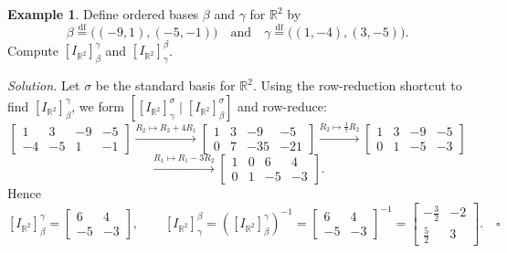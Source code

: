 \documentclass[11pt, a4paper, notitlepage]{report}
\theoremstyle{definition}
\newtheorem{example}[theorem]{Example}
\theoremstyle{remark}
\begin{document}
\begin{example}
\label{ex:change-coord-R2}
Define ordered bases $\beta$ and $\gamma$ for $\mathbb{R}^2$ by
\[
  \beta \stackrel{\mathrm{df}}{=} \bigl((-9,1),(-5,-1)\bigr)
  \quad\text{and}\quad
  \gamma \stackrel{\mathrm{df}}{=} \bigl((1,-4),(3,-5)\bigr).
\]
Compute $[I_{\mathbb{R}^2}]_\beta^\gamma$ and $[I_{\mathbb{R}^2}]_\gamma^\beta$.

\emph{Solution.}  Let $\sigma$ be the standard basis for $\mathbb{R}^2$.  Using the row-reduction shortcut to find $[I_{\mathbb{R}^2}]_\beta^\gamma$, we form $[[I_{\mathbb{R}^2}]_\gamma^\sigma \mid [I_{\mathbb{R}^2}]_\beta^\sigma]$
and row-reduce:
\[
  \left[\begin{array}{rr|rr}
    1 & 3 & -9 & -5 \\
    -4 & -5 & 1 & -1
  \end{array}\right]
  \xrightarrow{R_2 \mapsto R_2+4R_1}
  \left[\begin{array}{rr|rr}
    1 & 3 & -9 & -5 \\
    0 & 7 & -35 & -21
  \end{array}\right]
  \xrightarrow{R_2 \mapsto \frac{1}{7}R_2}
  \left[\begin{array}{rr|rr}
    1 & 3 & -9 & -5 \\
    0 & 1 & -5 & -3
  \end{array}\right]
\]
\[
  \xrightarrow{R_1 \mapsto R_1-3R_2}
  \left[\begin{array}{rr|rr}
    1 & 0 & 6 & 4 \\
    0 & 1 & -5 & -3
  \end{array}\right].
\]
Hence
\[
  [I_{\mathbb{R}^2}]_\beta^\gamma = \begin{bmatrix} 6 & 4 \\ -5 & -3 \end{bmatrix},
  \qquad
  [I_{\mathbb{R}^2}]_\gamma^\beta
  = \left([I_{\mathbb{R}^2}]_\beta^\gamma\right)^{-1}
  = \begin{bmatrix} 6 & 4 \\ -5 & -3 \end{bmatrix}^{-1}
  = \begin{bmatrix} -\tfrac{3}{2} & -2 \\ \tfrac{5}{2} & 3 \end{bmatrix}. \quad\square
\]
\end{example}
\end{document}
